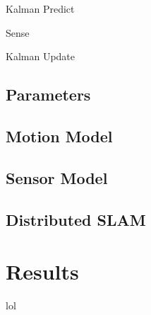 \documentclass[prodmode,acmtecs]{acmsmall} %
\begin{document}
Kalman Predict

Sense

Kalman Update

\subsection{Parameters}

\subsection{Motion Model}

\subsection{Sensor Model}

\subsection{Distributed SLAM}

\section{Results}

lol
\end{document}
